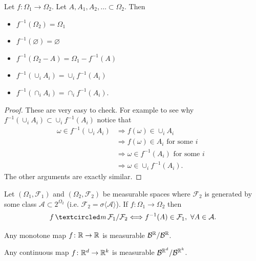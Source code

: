 \begin{theorem}
\label{thm pull back basic facts}
Let $f\colon \Omega_1 \rightarrow \Omega_2$. Let $A, A_1, A_2, \ldots \subset \Omega_2$. Then
\begin{itemize}
\item $f^{-1}(\Omega_2) = \Omega_1$
\item $f^{-1}(\varnothing) = \varnothing$
\item $f^{-1}(\Omega_2 - A) = \Omega_1 - f^{-1}(A)$
\item $f^{-1}(\cup_i A_i) =  \cup_i  f^{-1}(A_i)$
\item $f^{-1}(\cap_i A_i) = \cap_i  f^{-1}(A_i)$.
\end{itemize}
\end{theorem}
\begin{proof} These are very easy to check. For example  to see why $f^{-1}(\cup_i A_i) \subset  \cup_i  f^{-1}(A_i)$ notice that
\begin{align*}
\omega \in f^{-1}(\cup_i A_i)
&\Longrightarrow f(\omega) \in \cup_i A_i \\
&\Longrightarrow \text{$f(\omega) \in A_i$ for some $i$ }\\
&\Longrightarrow \text{$\omega \in f^{-1}(A_i)$ for some $i$ }\\
&\Longrightarrow \omega \in \cup_i f^{-1}(A_i).
\end{align*}
The other arguments are exactly similar.
\end{proof}


\begin{theorem}
\label{thm: GaE}
Let $(\Omega_1, \mathcal F_1)$ and $(\Omega_2,\mathcal F_2)$ be  measurable spaces where $\mathcal F_2$ is generated by some class $\mathcal A\subset 2^{\Omega_2}$ (i.e. $\mathcal F_2=\sigma\langle \mathcal A\rangle$). If $f:\Omega_1\rightarrow \Omega_2$ then
\[ f \mcirc \mathcal F_1/\mathcal F_2 \Longleftrightarrow f^{-1}(A)\in\mathcal F_1,\,\, \forall A\in\mathcal A.\]
\end{theorem}



\begin{corollary}
Any monotone map $f\colon \Bbb R\rightarrow \Bbb R$ is measurable $\mathcal B^{\Bbb R}/\mathcal B^{\Bbb R}$.
\end{corollary}

\begin{corollary}
Any continuous map $f\colon \Bbb R^d\rightarrow \Bbb R^k$ is measurable $\mathcal B^{\Bbb R^d}/\mathcal B^{\Bbb R^k}$.
\end{corollary}




